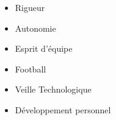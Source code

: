 %
%
%

\treecolumnsection
{
\begin{skills}
\end{skills}}
{
\vspace{1em}
\begin{itemize}
	\item Rigueur
	\item Autonomie                   
    \item Esprit d'équipe
\end{itemize}
}
{
\vspace{1em}
\begin{itemize}
	\item Football
	\item Veille Technologique                   
    \item Développement personnel
\end{itemize}
}